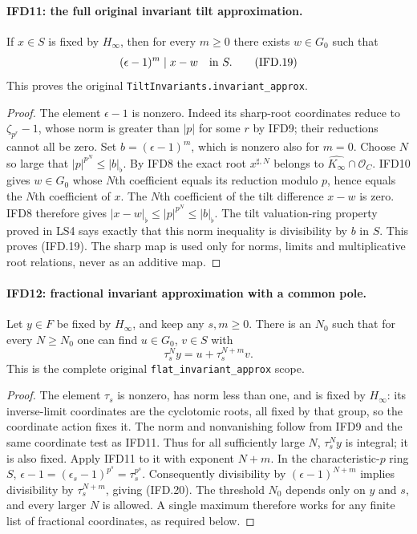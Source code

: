 \paragraph{IFD11: the full original invariant tilt approximation.}
\label{claim:IFD11}
If $x\in S$ is fixed by $H_\infty$, then for every $m\geq0$
there exists $w\in G_0$ such that
\[
                           (\epsilon-1)^m\mid x-w
                                      \quad\hbox{in }S.    \tag{IFD.19}
\]
This proves the original \texttt{TiltInvariants.invariant\_approx}.

\begin{proof}
The element $\epsilon-1$ is nonzero. Indeed its sharp-root
coordinates reduce to $\zeta_{p^r}-1$, whose norm is greater than
$|p|$ for some $r$ by IFD9; their reductions cannot all be zero.
Set $b=(\epsilon-1)^m$, which is nonzero also for $m=0$.
Choose $N$ so large that $|p|^{p^N}\leq|b|_\flat$.
By IFD8 the exact root $x^{\sharp,N}$ belongs to
$\widehat{K_\infty}\cap\mathcal O_C$.
IFD10 gives $w\in G_0$ whose $N$th coefficient equals its
reduction modulo $p$, hence equals the $N$th coefficient of $x$.
The $N$th coefficient of the tilt difference $x-w$ is zero.
IFD8 therefore gives $|x-w|_\flat\leq|p|^{p^N}\leq|b|_\flat$.
The tilt valuation-ring property proved in LS4 says exactly that
this norm inequality is divisibility by $b$ in $S$.
This proves (IFD.19). The sharp map is used only for norms,
limits and multiplicative root relations, never as an additive map.
\end{proof}

\paragraph{IFD12: fractional invariant approximation with a common pole.}
\label{claim:IFD12}
Let $y\in F$ be fixed by $H_\infty$, and keep any $s,m\geq0$.
There is an $N_0$ such that for every $N\geq N_0$ one can find
$u\in G_0$, $v\in S$ with
\[
                         \tau_s^N y=u+\tau_s^{N+m}v.
                                                               \tag{IFD.20}
\]
This is the complete original \texttt{flat\_invariant\_approx} scope.

\begin{proof}
The element $\tau_s$ is nonzero, has norm less than one, and is
fixed by $H_\infty$: its inverse-limit coordinates are the
cyclotomic roots, all fixed by that group, so the coordinate action
fixes it. The norm and nonvanishing follow from IFD9 and the same
coordinate test as IFD11. Thus for all sufficiently large $N$,
$\tau_s^N y$ is integral; it is also fixed.
Apply IFD11 to it with exponent $N+m$.
In the characteristic-$p$ ring $S$,
$\epsilon-1=(\epsilon_s-1)^{p^s}=\tau_s^{p^s}$.
Consequently divisibility by $(\epsilon-1)^{N+m}$ implies
divisibility by $\tau_s^{N+m}$, giving (IFD.20).
The threshold $N_0$ depends only on $y$ and $s$, and every larger
$N$ is allowed. A single maximum therefore works for any finite
list of fractional coordinates, as required below.
\end{proof}

